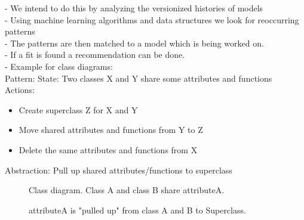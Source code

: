 \documentclass[10pt,a4paper,oneside]{scrartcl}
\begin{document}
- We intend to do this by analyzing the versionized histories of models
\\
- Using machine learning algorithms and data structures we look for reoccurring patterns
\\
- The patterns are then matched to a model which is being worked on. 
\\
- If a fit is found a recommendation can be done.
\\
- Example for class diagrams:\\
Pattern:
State: Two classes X and Y share some attributes and functions\\
Actions: \\
\begin{itemize}
	\item Create superclass Z for X and Y
	\item Move shared attributes and functions from Y to Z
	\item Delete the same attributes and functions from X
\end{itemize}
Abstraction: Pull up shared attributes/functions to superclass
\begin{center}
	\begin{figure}
		\caption{Class diagram. Class A and class B share attributeA.}
	\end{figure}
\end{center}

\begin{center}
	\begin{figure}
		\caption{attributeA is "pulled up" from class A and B to Superclass. }
	\end{figure}
\end{center}
\end{document}
